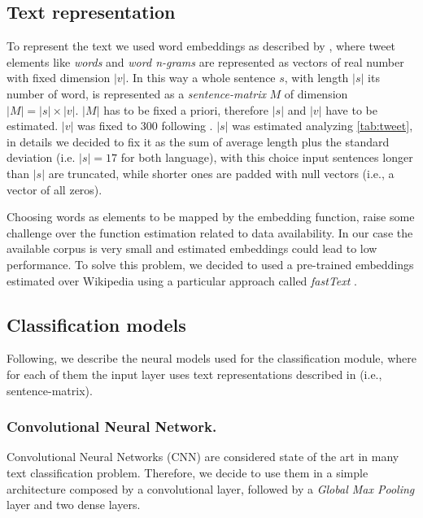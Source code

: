 \subsection{Text representation} \label{subsec:representation}
To represent the text we used word embeddings as described by \cite{bojanowski2016enriching}, where tweet elements like \emph{words} and \emph{word n-grams} are represented as vectors of real number with fixed dimension $|v|$.
In this way a whole sentence $s$, with length $|s|$ its number of word, is represented as a \emph{sentence-matrix} $M$ of dimension $|M| = |s| \times |v|$. $|M|$ has to be fixed a priori, therefore $|s|$ and $|v|$ have to be estimated. $|v|$ was fixed to 300 following \cite{bojanowski2016enriching}. $|s|$ was estimated analyzing \cref{tab:tweet}, in details we decided to fix it as the sum of average length plus the standard deviation (i.e. $|s| = 17$ for both language), with this choice input sentences longer than $|s|$ are truncated, while shorter ones are padded with null vectors (i.e., a vector of all zeros).

Choosing words as elements to be mapped by the embedding function, raise some challenge over the function estimation related to data availability. In our case the available corpus is very small and estimated embeddings could lead to low performance.
To solve this problem, we decided to used a pre-trained embeddings estimated over Wikipedia using a particular approach called \emph{fastText} \cite{bojanowski2016enriching}.


\subsection{Classification models} \label{subsec:classificationModel}
Following, we describe the neural models used for the classification module, where for each of them the input layer uses text representations described in  (i.e., sentence-matrix).


\subsubsection{Convolutional Neural Network.}
Convolutional Neural Networks (CNN) are considered state of the art in many text classification problem. Therefore, we decide to use them in a simple architecture composed by a convolutional layer, followed by a \emph{Global Max Pooling} layer and two dense layers.

